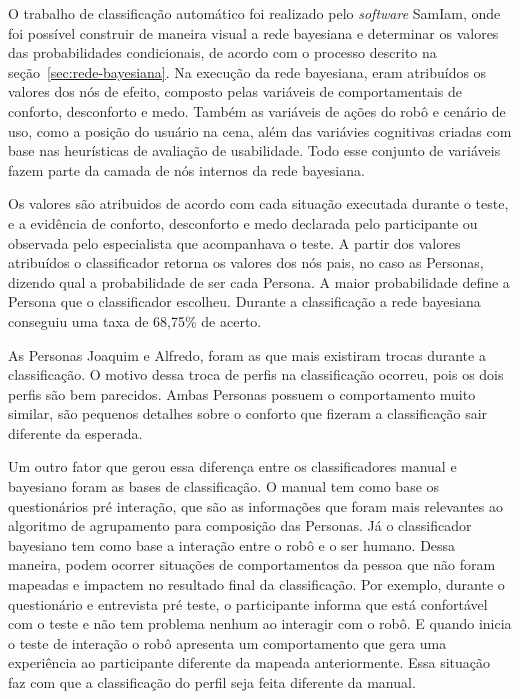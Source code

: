 O trabalho de classificação automático foi realizado pelo \emph{software} SamIam, onde foi possível construir de maneira visual a rede bayesiana e determinar os valores das probabilidades condicionais, de acordo com o processo descrito na seção~\ref{sec:rede-bayesiana}. Na execução da rede bayesiana, eram atribuídos os valores dos nós de efeito, composto pelas variáveis de comportamentais de conforto, desconforto e medo. Também as variáveis de ações do robô e cenário de uso, como a posição do usuário na cena, além das variávies cognitivas criadas com base nas heurísticas de avaliação de usabilidade. Todo esse conjunto de variáveis fazem parte da camada de nós internos da rede bayesiana.

Os valores são atribuidos de acordo com cada situação executada durante o teste, e a evidência de conforto, desconforto e medo declarada pelo participante ou observada pelo especialista que acompanhava o teste. A partir dos valores atribuídos o classificador retorna os valores dos nós pais, no caso as Personas, dizendo qual a probabilidade de ser cada Persona. A maior probabilidade define a Persona que o classificador escolheu. Durante a classificação a rede bayesiana conseguiu uma taxa de 68,75\% de acerto.

As Personas Joaquim e Alfredo, foram as que mais existiram trocas durante a classificação. O motivo dessa troca de perfis na classificação ocorreu, pois os dois perfis são bem parecidos. Ambas Personas possuem o comportamento muito similar, são pequenos detalhes sobre o conforto que fizeram a classificação sair diferente da esperada.

Um outro fator que gerou essa diferença entre os classificadores manual e bayesiano foram as bases de classificação. O manual tem como base os questionários pré interação, que são as informações que foram mais relevantes ao algoritmo de agrupamento para composição das Personas. Já o classificador bayesiano tem como base a interação entre o robô e o ser humano. Dessa maneira, podem ocorrer situações de comportamentos da pessoa que não foram mapeadas e impactem no resultado final da classificação. Por exemplo, durante o questionário e entrevista pré teste, o participante informa que está confortável com o teste e não tem problema nenhum ao interagir com o robô. E quando inicia o teste de interação o robô apresenta um comportamento que gera uma experiência ao participante diferente da mapeada anteriormente. Essa situação faz com que a classificação do perfil seja feita diferente da manual.

